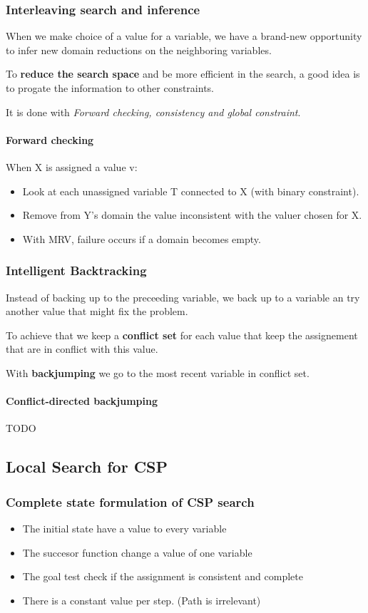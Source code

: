 \subsubsection{Interleaving search and inference} 
When we make choice of a value for a variable, we have a brand-new opportunity to infer new
domain reductions on the neighboring variables.

To \textbf{reduce the search  space} and be more efficient in  the search, a good
idea is to progate the information to other constraints. 

It  is  done  with  \textit{Forward  checking,  consistency  and  global
constraint}.

\paragraph{\textbf{Forward checking} }
When X is assigned a value v:
\begin{itemize}
	\item Look at each unassigned variable T connected to X (with binary constraint).
	\item Remove from Y's domain the value inconsistent with the valuer chosen for X.
	\item With MRV, failure occurs if a domain becomes empty.
\end{itemize}

\subsubsection{Intelligent Backtracking}  Instead of  backing up  to the
preceeding variable, we back up to  a variable an try another value that
might fix the problem.

To achieve that we keep a \textbf{conflict set} for each value that keep
the assignement that are in conflict with this value.

With \textbf{backjumping} we go to  the most recent variable in conflict
set.

\paragraph{Conflict-directed backjumping} TODO


\subsection{Local Search for CSP}

\subsubsection{Complete state formulation of CSP search }
\begin{itemize}
	\item The initial state have a value to every variable
	\item The succesor function change a value of one variable
	\item The goal test check if the assignment is consistent and complete
	\item There is a constant value per step. (Path is irrelevant)
\end{itemize}


